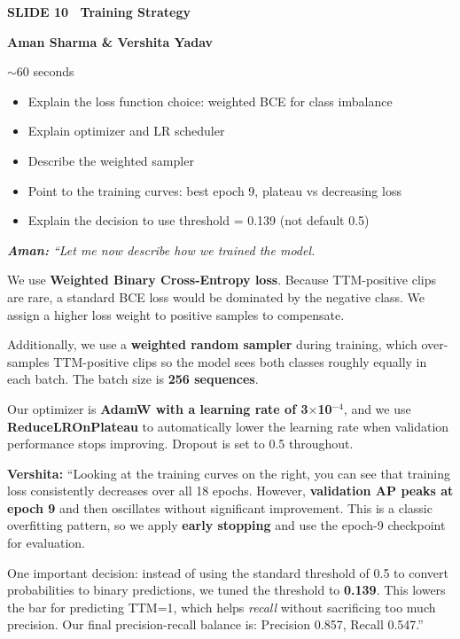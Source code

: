 \documentclass[11pt, a4paper]{article}
\newcommand{\slideheading}[3]{%
  \vspace{0.6cm}
  \begin{tcolorbox}[slidebox]
    \textbf{\color{NavyBlue}SLIDE #1 \textemdash\ #2}\\[2pt]
    \begin{tcolorbox}[presenterbox, title=Presenter(s)]
      \color{AccBlue}\bfseries #3
    \end{tcolorbox}
  \end{tcolorbox}
}
\newcommand{\timing}[1]{%
  \begin{tcolorbox}[timebox, title=Suggested Time]
    \color{AccOrange} #1
  \end{tcolorbox}
}
\newcommand{\keypoints}[1]{%
  \begin{tcolorbox}[keybox, title=Key Points to Cover]
    #1
  \end{tcolorbox}
}
\newcommand{\script}[1]{%
  \begin{mdframed}[
    backgroundcolor=white,
    linecolor=MidText!40,
    linewidth=0.5pt,
    leftmargin=0pt,
    rightmargin=0pt,
    innerleftmargin=10pt,
    innerrightmargin=8pt,
    innertopmargin=8pt,
    innerbottommargin=8pt,
    roundcorner=3pt
  ]
  \itshape\color{MidText}
  #1
  \end{mdframed}
}
\begin{document}
\slideheading{10}{Training Strategy}{Aman Sharma \& Vershita Yadav}

\timing{$\sim$60 seconds}

\keypoints{%
\begin{itemize}[leftmargin=*, itemsep=2pt]
  \item Explain the loss function choice: weighted BCE for class imbalance
  \item Explain optimizer and LR scheduler
  \item Describe the weighted sampler
  \item Point to the training curves: best epoch 9, plateau vs decreasing loss
  \item Explain the decision to use threshold = 0.139 (not default 0.5)
\end{itemize}
}

\script{%
\textbf{Aman:} ``Let me now describe how we trained the model.

We use \textbf{Weighted Binary Cross-Entropy loss}. Because TTM-positive clips are rare, a standard BCE loss would be dominated by the negative class. We assign a higher loss weight to positive samples to compensate.

Additionally, we use a \textbf{weighted random sampler} during training, which over-samples TTM-positive clips so the model sees both classes roughly equally in each batch. The batch size is \textbf{256 sequences}.

Our optimizer is \textbf{AdamW with a learning rate of 3$\times$10$^{-4}$}, and we use \textbf{ReduceLROnPlateau} to automatically lower the learning rate when validation performance stops improving. Dropout is set to 0.5 throughout.

\textbf{Vershita:} ``Looking at the training curves on the right, you can see that training loss consistently decreases over all 18 epochs. However, \textbf{validation AP peaks at epoch 9} and then oscillates without significant improvement. This is a classic overfitting pattern, so we apply \textbf{early stopping} and use the epoch-9 checkpoint for evaluation.

One important decision: instead of using the standard threshold of 0.5 to convert probabilities to binary predictions, we tuned the threshold to \textbf{0.139}. This lowers the bar for predicting TTM=1, which helps \textit{recall} without sacrificing too much precision. Our final precision-recall balance is: Precision 0.857, Recall 0.547.''
}
\end{document}
